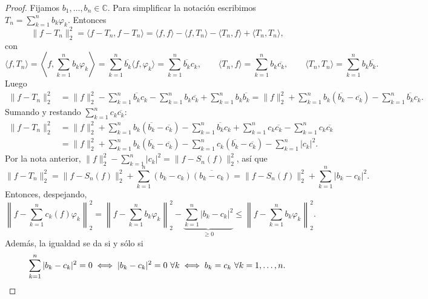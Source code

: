 \begin{proof}
Fijamos $b_1, \dots, b_n \in \mathbb{C}$. Para simplificar la notación escribimos $T_n = \sum_{k=1}^n b_k\varphi_k$. Entonces
\[
\|f - T_n\|_2^2 = \langle f - T_n, f - T_n\rangle = \langle f, f\rangle - \langle f, T_n\rangle - \langle T_n, f\rangle + \langle T_n, T_n\rangle,
\]
con
\[
\langle f, T_n\rangle = \left\langle f, \sum_{k=1}^n b_k\varphi_k\right\rangle = \sum_{k=1}^n \overline{b_k}\langle f, \varphi_k\rangle = \sum_{k=1}^n \overline{b_k}c_k, \qquad \langle T_n, f\rangle = \sum_{k=1}^n b_k\overline{c_k}, \qquad \langle T_n, T_n\rangle = \sum_{k=1}^n b_k\overline{b_k}.
\]
Luego
\begin{align*}
\|f - T_n\|_2^2 &= \|f\|_2^2 - \sum_{k=1}^n \overline{b_k}c_k - \sum_{k=1}^n b_k\overline{c_k} + \sum_{k=1}^n b_k\overline{b_k} = \|f\|_2^2 + \sum_{k=1}^n b_k(\overline{b_k} - \overline{c_k}) - \sum_{k=1}^n \overline{b_k}c_k.
\end{align*}
Sumando y restando $\sum_{k=1}^n c_k\overline{c_k}$:
\begin{align*}
\|f - T_n\|_2^2 &= \|f\|_2^2 + \sum_{k=1}^n b_k(\overline{b_k} - \overline{c_k}) - \sum_{k=1}^n \overline{b_k}c_k + \sum_{k=1}^n c_k\overline{c_k} - \sum_{k=1}^n c_k\overline{c_k} \\
&= \|f\|_2^2 + \sum_{k=1}^n b_k(\overline{b_k} - \overline{c_k}) - \sum_{k=1}^n c_k(\overline{b_k} - \overline{c_k}) - \sum_{k=1}^n |c_k|^2.
\end{align*}
Por la nota anterior, $\|f\|_2^2 - \sum_{k=1}^n |c_k|^2 = \|f - S_n(f)\|_2^2$, así que
\[
\|f - T_n\|_2^2 = \|f - S_n(f)\|_2^2 + \sum_{k=1}^n (b_k - c_k)\overline{(b_k - c_k)} = \|f - S_n(f)\|_2^2 + \sum_{k=1}^n |b_k - c_k|^2.
\]
Entonces, despejando,
\[
\left\| f - \sum_{k=1}^n c_k(f)\varphi_k \right\|_2^2 = \left\| f - \sum_{k=1}^n b_k\varphi_k \right\|_2^2 - \underbrace{\sum_{k=1}^n |b_k - c_k|^2}_{\ge 0} \le \left\| f - \sum_{k=1}^n b_k\varphi_k \right\|_2^2.
\]
Además, la igualdad se da si y sólo si
\[
\sum_{k=1}^n |b_k - c_k|^2 = 0 \iff |b_k - c_k|^2 = 0 \ \forall k \iff b_k = c_k \ \forall k = 1, \dots, n. \qedhere
\]
\end{proof}
